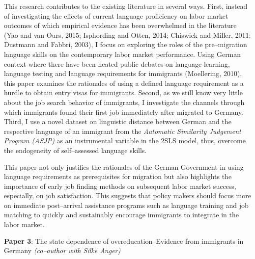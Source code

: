 \documentclass[a4paper, 11pt]{article} %
\begin{document}
This research contributes to the existing literature in several ways. First, instead of investigating the effects of current language proficiency on labor market outcomes of which empirical evidence has been overwhelmed in the literature (Yao and van Ours, 2015; Isphording and Otten, 2014; Chiswick and Miller, 2011; Dustmann and Fabbri, 2003), I focus on exploring the roles of the pre--migration language skills on the contemporary labor market performance. Using German context where there have been heated public debates on language learning, language testing and language requirements for immigrants (Moellering, 2010), this paper examines the rationales of using a defined language requirement as a hurdle to obtain entry visas for immigrants. Second, as we still know very little about the job search behavior of immigrants, I investigate the channels through which immigrants found their first job immediately after migrated to Germany. Third, I use a novel dataset on linguistic distance between German and the respective language of an immigrant from the \textit{Automatic Similarity Judgement Program (ASJP)} as an instrumental variable in the 2SLS model, thus, overcome the endogeneity of self--assessed language skills.

This paper not only justifies the rationales of the German Government in using language requirements as prerequisites for migration but also highlights the importance of early job finding methods on subsequent labor market success, especially, on job satisfaction. This suggests that policy makers should focus more on immediate post--arrival assistance programs such as language training and job matching to quickly and sustainably encourage immigrants to integrate in the labor market.

\vspace{15pt}

\textbf{Paper 3}: The state dependence of overeducation--Evidence from immigrants in Germany \textit{(co--author with Silke Anger)}

\vspace{15pt}
\end{document}
